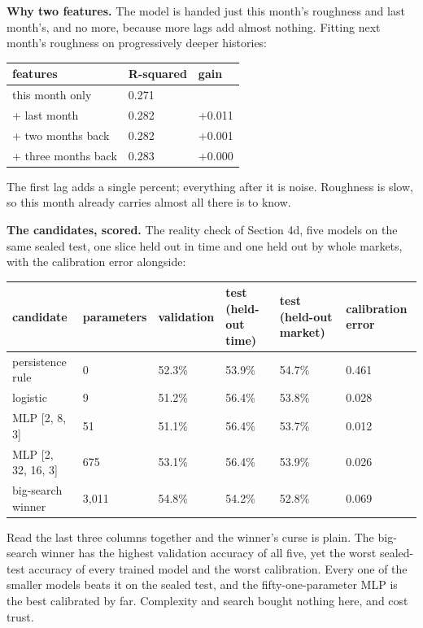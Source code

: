 \documentclass[11pt]{article} %
\begin{document}
\textbf{Why two features.} The model is handed just this month's roughness and last month's, and no more, because more lags add almost nothing. Fitting next month's roughness on progressively deeper histories:

\begin{center}
\begin{tabular}{lll}
\hline
features & R-squared & gain \\
\hline
this month only & 0.271 &  \\
+ last month & 0.282 & +0.011 \\
+ two months back & 0.282 & +0.001 \\
+ three months back & 0.283 & +0.000 \\
\hline
\end{tabular}
\end{center}


The first lag adds a single percent; everything after it is noise. Roughness is slow, so this month already carries almost all there is to know.

\textbf{The candidates, scored.} The reality check of Section 4d, five models on the same sealed test, one slice held out in time and one held out by whole markets, with the calibration error alongside:

\begin{center}
\begin{tabular}{llllll}
\hline
candidate & parameters & validation & test (held-out time) & test (held-out market) & calibration error \\
\hline
persistence rule & 0 & 52.3\% & 53.9\% & 54.7\% & 0.461 \\
logistic & 9 & 51.2\% & 56.4\% & 53.8\% & 0.028 \\
MLP [2, 8, 3] & 51 & 51.1\% & 56.4\% & 53.7\% & 0.012 \\
MLP [2, 32, 16, 3] & 675 & 53.1\% & 56.4\% & 53.9\% & 0.026 \\
big-search winner & 3,011 & 54.8\% & 54.2\% & 52.8\% & 0.069 \\
\hline
\end{tabular}
\end{center}


Read the last three columns together and the winner's curse is plain. The big-search winner has the highest validation accuracy of all five, yet the worst sealed-test accuracy of every trained model and the worst calibration. Every one of the smaller models beats it on the sealed test, and the fifty-one-parameter MLP is the best calibrated by far. Complexity and search bought nothing here, and cost trust.




\end{document}
